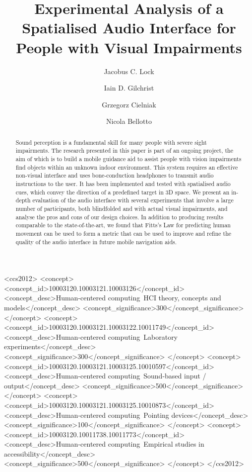\documentclass[acmsmall]{acmart}
\begin{document}
\title{Experimental Analysis of a Spatialised Audio Interface for People with Visual Impairments}

\author{Jacobus C. Lock}

\author{Iain D. Gilchrist}

\author{Grzegorz Cielniak}

\author{Nicola Bellotto}

\begin{abstract}
  Sound perception is a fundamental skill for many people with severe sight impairments.
  The research presented in this paper is part of an ongoing project, the aim of which is to build a mobile guidance aid to assist people with vision impairments find objects within an unknown indoor environment.
  This system requires an effective non-visual interface and uses bone-conduction headphones to transmit audio instructions to the user.
  It has been implemented and tested with spatialised audio cues, which convey the direction of a predefined target in 3D space.
  We present an in-depth evaluation of the audio interface with several experiments that involve a large number of participants, both blindfolded and with actual visual impairments, and analyse the pros and cons of our design choices.
  In addition to producing results comparable to the state-of-the-art, we found that Fitts's Law for predicting human movement can be used to form a metric that can be used to improve and refine the quality of the audio interface in future mobile navigation aids. 
\end{abstract}

\begin{CCSXML}
<ccs2012>
<concept>
<concept_id>10003120.10003121.10003126</concept_id>
<concept_desc>Human-centered computing~HCI theory, concepts and models</concept_desc>
<concept_significance>300</concept_significance>
</concept>
<concept>
<concept_id>10003120.10003121.10003122.10011749</concept_id>
<concept_desc>Human-centered computing~Laboratory experiments</concept_desc>
<concept_significance>300</concept_significance>
</concept>
<concept>
<concept_id>10003120.10003121.10003125.10010597</concept_id>
<concept_desc>Human-centered computing~Sound-based input / output</concept_desc>
<concept_significance>500</concept_significance>
</concept>
<concept>
<concept_id>10003120.10003121.10003125.10010873</concept_id>
<concept_desc>Human-centered computing~Pointing devices</concept_desc>
<concept_significance>100</concept_significance>
</concept>
<concept>
<concept_id>10003120.10011738.10011773</concept_id>
<concept_desc>Human-centered computing~Empirical studies in accessibility</concept_desc>
<concept_significance>500</concept_significance>
</concept>
</ccs2012>
\end{CCSXML}
\end{document}
